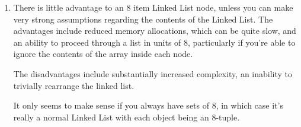 \documentclass[12pt]{chmullighw}
\begin{document}
\begin{enumerate}

\item There is little advantage to an 8 item Linked List node, unless you can
make very strong assumptions regarding the contents of the Linked List. The
advantages include reduced memory allocations, which can be quite slow, and
an ability to proceed through a list in units of 8, particularly if you're able
to ignore the contents of the array inside each node.

The disadvantages include substantially increased complexity, an inability to
trivially rearrange the linked list.

It only seems to make sense if you always have sets of 8, in which case it's
really a normal Linked List with each object being an 8-tuple.



\end{enumerate} %
\end{document}
